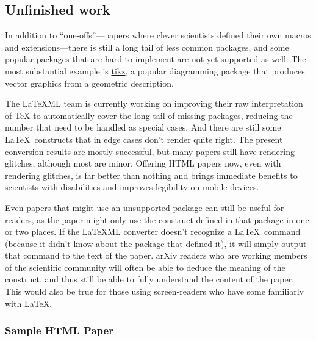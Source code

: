 \documentclass{easychair}
\begin{document}
\subsection{Unfinished work}
\label{sect:Unfinished work}

In addition to ``one-offs''---papers where clever scientists defined their own macros and extensions---there is still a long tail of less common packages, and some popular packages that are hard to implement are not yet supported as well. The most substantial example is \href{https://tikz.dev/}{tikz}, a popular diagramming package that produces vector graphics from a geometric description.

The LaTeXML team is currently working on improving their raw interpretation of TeX to automatically cover the long-tail of missing packages, reducing the number that need to be handled as special cases. And there are still some \LaTeX\ constructs that in edge cases don’t render quite right. The present conversion results are mostly successful, but many papers still have rendering glitches, although most are minor. Offering HTML papers now, even with rendering glitches, is far better than nothing and brings immediate benefits to scientists with disabilities and improves legibility on mobile devices.

Even papers that might use an unsupported package can still be useful for readers, as the paper might only use the construct defined in that package in one or two places. If the LaTeXML converter doesn't recognize a \LaTeX\ command (because it didn't know about the package that defined it), it will simply output that command to the text of the paper. arXiv readers who are working members of the scientific community will often be able to deduce the meaning of the construct, and thus still be able to fully understand the content of the paper. This would also be true for those using screen-readers who have some familiarly with \LaTeX.

\subsubsection{Sample HTML Paper}
\label{sect:Sample HTML paper}
\end{document}
